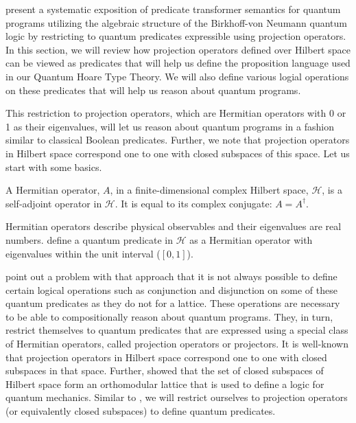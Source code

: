 \documentclass[acmsmall,nonacm,timestamp,review=false,anonymous=false]{acmart}
\begin{document}
\citet{ying_duan_feng_ji_2009} present a systematic exposition of predicate transformer semantics for quantum programs utilizing the algebraic structure of the Birkhoff-von Neumann quantum logic by restricting to quantum predicates expressible using projection operators. In this section, we will review how projection operators defined over Hilbert space can be viewed as predicates that will help us define the proposition language used in our Quantum Hoare Type Theory. We will also define various logial operations on these predicates that will help us reason about quantum programs.

This restriction to projection operators, which are Hermitian operators with 0 or 1 as their eigenvalues, will let us reason about quantum programs in a fashion similar to classical Boolean predicates. Further, we note that projection operators in Hilbert space correspond one to one with closed subspaces of this space. Let us start with some basics.

\begin{definition}
	A Hermitian operator, $A$, in a finite-dimensional complex Hilbert space, $\mathcal{H}$, is a self-adjoint operator in $\mathcal{H}$. It is equal to its complex conjugate: $A = A^\dagger$.
\end{definition}
Hermitian operators describe physical observables and their eigenvalues are real numbers. \citet{dhondt_quantum_2006} define a quantum predicate in $\mathcal{H}$ as a Hermitian operator with eigenvalues within the unit interval ($[0, 1]$).

\citet{ying_duan_feng_ji_2009} point out a problem with that approach that it is not always possible to define certain logical operations such as conjunction and disjunction on some of these quantum predicates as they do not for a lattice. These operations are necessary to be able to compositionally reason about quantum programs. They, in turn, restrict themselves to quantum predicates that are expressed using a special class of Hermitian operators, called projection operators or projectors. It is well-known that projection operators in Hilbert space correspond one to one with closed subspaces in that space. Further, \citet{logicqm36} showed that the set of closed subspaces of Hilbert space form an orthomodular lattice that is used to define a logic for quantum mechanics. Similar to \cite{ying_duan_feng_ji_2009}, we will restrict ourselves to projection operators (or equivalently closed subspaces) to define quantum predicates.
\end{document}
